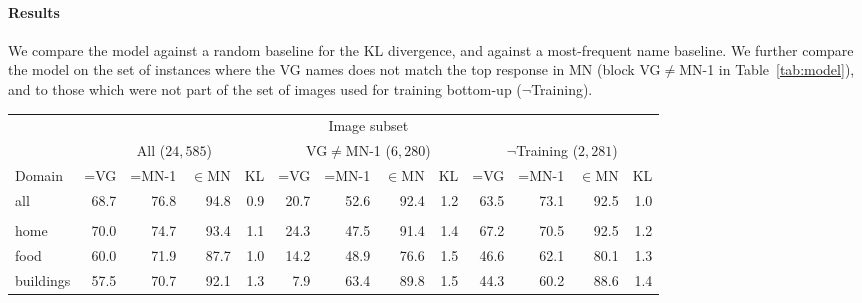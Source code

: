 \paragraph{Results} 
We compare the model against a random baseline for the KL divergence, and against a most-frequent name baseline. 
We further compare the model on the set of instances where the VG names does not match the top response in MN (block \mbox{VG$\neq$MN-1} in Table~\ref{tab:model}), and to those which were not part of the set of images used for training bottom-up ($\neg$Training).
%
\begin{table*}
	\centering
	\small
\begin{tabular}{l@{~}|@{~}r@{~}r@{~}rr@{~}|@{~}r@{~}r@{~}rr@{~}|@{~}r@{~}r@{~}rr}
	\toprule
		& \multicolumn{12}{c}{Image subset} \\
		&	\multicolumn{4}{c}{All ($24,585$)} 
		& \multicolumn{4}{c}{VG$\neq$MN-1 ($6,280$)}
		& \multicolumn{4}{c}{$\neg$Training ($2,281$)} \\
	\midrule
		Domain	 &  =VG & =MN-1 & $\in$MN  &  KL
		&  =VG & =MN-1 & $\in$MN  & KL
		&  =VG & =MN-1 & $\in$MN  & KL\\
\midrule
all            &               68.7 &                 76.8 &                   94.8 &            0.9 &            20.7 &              52.6 &                92.4 &         1.2 &             63.5 &               73.1 &                 92.5 &          1.0 \\ \\
home           &               70.0 &                 74.7 &                   93.4 &            1.1 &            24.3 &              47.5 &                91.4 &         1.4 &             67.2 &               70.5 &                 92.5 &          1.2 \\
food           &               60.0 &                 71.9 &                   87.7 &            1.0 &            14.2 &              48.9 &                76.6 &         1.5 &             46.6 &               62.1 &                 80.1 &          1.3 \\
buildings      &               57.5 &                 70.7 &                   92.1 &            1.3 &             7.9 &              63.4 &                89.8 &         1.5 &             44.3 &               60.2 &                 88.6 &          1.4 \\

\end{tabular}
\end{table*}
